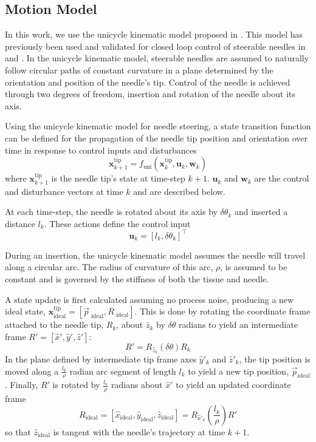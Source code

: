 \documentclass[journal,transmag]{IEEEtran}
\newcommand{\bvar}[2]{\mathbf{#1}_{#2}}
\newcommand{\unistate}[2]{\mathbf{#1}^{\text{tip}}_{#2}}
\begin{document}
\subsection{Motion Model} \label{subsec:unicycle}
In this work, we use the unicycle kinematic model proposed in \cite{Park2005}.  This model has previously been used and validated for closed loop control of steerable needles in \cite{Majewicz2013} and \cite{adebar2014recursive}.  In the unicycle kinematic model, steerable needles are assumed to naturally follow circular paths of constant curvature in a plane determined by the orientation and position of the needle's tip.  Control of the needle is achieved through two degrees of freedom, insertion and rotation of the needle about its axis.

Using the unicycle kinematic model for needle steering, a state transition function can be defined for the propagation of the needle tip position and orientation over time in response to control inputs and disturbances
\begin{equation*}
\unistate{x}{k+1} = f_{\text{uni}}(\unistate{x}{k}, \bvar{u}{k}, \bvar{w}{k})
\end{equation*}  
where $\unistate{x}{k+1}$ is the needle tip's state at time-step $k+1$. $\bvar{u}{k}$ and $\bvar{w}{k}$ are the control and disturbance vectors at time $k$ and are described below.  

At each time-step, the needle is rotated about its axis by $\delta \theta_k$ and inserted a distance $l_k$.  These actions define the control input 
\begin{equation*}
\bvar{u}{k} = \left[l_k, \delta\theta_k\right]^\top
\end{equation*}  

During an insertion, the unicycle kinematic model assumes the needle will travel along a circular arc.  The radius of curvature of this arc, $\rho$, is assumed to be constant and is governed by the stiffness of both the tissue and needle.  

A state update is first calculated assuming no process noise, producing a new ideal state, $\unistate{x}{\text{ideal}} = \left[\vec{p}_{\text{ ideal}}, R_{\text{ ideal}}\right]$.  This is done by rotating the coordinate frame attached to the needle tip, $R_k$, about $\hat{z}_k$ by $\delta \theta$ radians to yield an intermediate frame $R' = [\hat{x}', \hat{y}', \hat{z}']$:
\begin{equation*}
R' = R_{\hat{z}_k}(\delta\theta)R_k
\end{equation*}
In the plane defined by intermediate tip frame axes $\hat{y}'_k$ and $\hat{z}'_k$, the tip position is moved along a $\frac{l_k}{\rho}$ radian arc segment of length $l_k$ to yield a new tip position, $\vec{p}_{\text{ideal}}$.  Finally, $R'$ is rotated by $\frac{l_k}{\rho}$ radians about $\hat{x}'$ to yield an updated coordinate frame
\begin{equation*}
R_{\text{ideal}} = [\hat{x}_{\text{ideal}}, \hat{y}_{\text{ideal}}, \hat{z}_{\text{ideal}}] = R_{\hat{x}'_k}\left(\frac{l_k}{\rho}\right)R'
\end{equation*}
so that $\hat{z}_{\text{ideal}}$ is tangent with the needle's trajectory at time $k+1$.  
\end{document}
